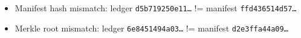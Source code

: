 \begin{itemize}[nosep]
\item Manifest hash mismatch: ledger \texttt{d5b719250e11\ldots} != manifest \texttt{ffd436514d57\ldots}
\item Merkle root mismatch: ledger \texttt{6e8451494a03\ldots} != manifest \texttt{d2e3ffa44a09\ldots}
\end{itemize}
